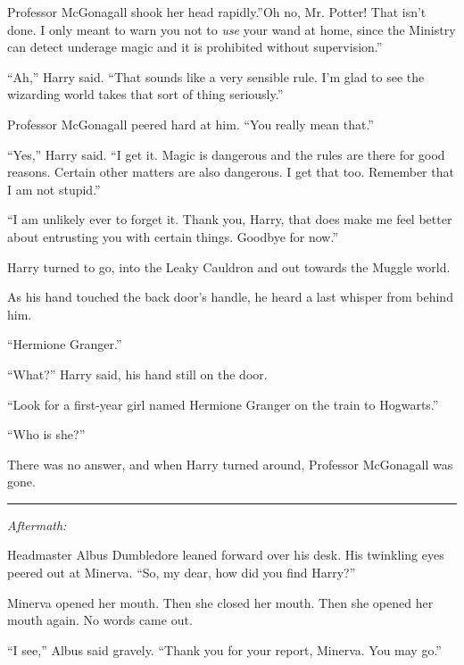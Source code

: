 Professor McGonagall shook her head rapidly.''Oh no, Mr. Potter! That
isn't done. I only meant to warn you not to \emph{use} your wand at
home, since the Ministry can detect underage magic and it is prohibited
without supervision.''

``Ah,'' Harry said. ``That sounds like a very sensible rule. I'm glad to
see the wizarding world takes that sort of thing seriously.''

Professor McGonagall peered hard at him. ``You really mean that.''

``Yes,'' Harry said. ``I get it. Magic is dangerous and the rules are
there for good reasons. Certain other matters are also dangerous. I get
that too. Remember that I am not stupid.''

``I am unlikely ever to forget it. Thank you, Harry, that does make me
feel better about entrusting you with certain things. Goodbye for now.''

Harry turned to go, into the Leaky Cauldron and out towards the Muggle
world.

As his hand touched the back door's handle, he heard a last whisper from
behind him.

``Hermione Granger.''

``What?'' Harry said, his hand still on the door.

``Look for a first-year girl named Hermione Granger on the train to
Hogwarts.''

``Who is she?''

There was no answer, and when Harry turned around, Professor McGonagall
was gone.

\begin{center}\rule{3in}{0.4pt}\end{center}

\emph{Aftermath:}

Headmaster Albus Dumbledore leaned forward over his desk. His twinkling
eyes peered out at Minerva. ``So, my dear, how did you find Harry?''

Minerva opened her mouth. Then she closed her mouth. Then she opened her
mouth again. No words came out.

``I see,'' Albus said gravely. ``Thank you for your report, Minerva. You
may go.''
